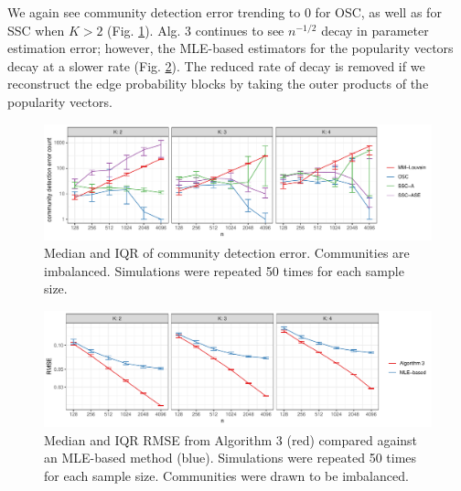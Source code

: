 \documentclass[12pt]{article}
\begin{document}
We again see community detection error trending to 0 for OSC, as well as
for SSC when \(K > 2\) (Fig. \ref{fig:clust_err_ct_sim_imba}). Alg. 3
continues to see \(n^{-1/2}\) decay in parameter estimation error; 
however, the MLE-based estimators for the popularity vectors decay at a slower 
rate (Fig. \ref{fig:lambda_est_k_imba}). 
The reduced rate of decay is removed 
if we reconstruct the edge probability blocks 
by taking the outer products of the popularity vectors. 

\begin{figure}[H]

{\centering \includegraphics{summary_files/figure-latex/clust_err_ct_sim_imba-1}

}

\caption{Median and IQR of community detection error. Communities are imbalanced. Simulations were repeated 50 times for each sample size.}\label{fig:clust_err_ct_sim_imba}
\end{figure}

\begin{figure}[H]

{\centering \includegraphics{summary_files/figure-latex/lambda_est_k_imba-1}

}

\caption{Median and IQR RMSE from Algorithm 3 (red) compared against an MLE-based method (blue). Simulations were repeated 50 times for each sample size. Communities were drawn to be imbalanced.}\label{fig:lambda_est_k_imba}
\end{figure}
\end{document}
